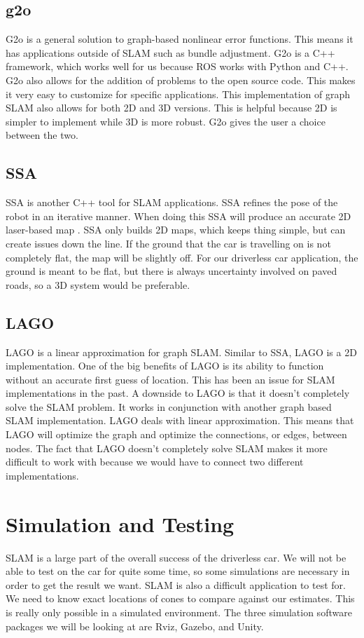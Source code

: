 \documentclass[10pt, onecolumn, draftclsnofoot, letterpaper,compsoc]{IEEEtran}
\begin{document}
\subsection{g2o}
G2o is a general solution to graph-based nonlinear error functions. This means it has applications outside of SLAM such as bundle adjustment. G2o is a C++ framework, which works well for us because ROS works with Python and C++. G2o also allows for the addition of problems to the open source code. This makes it very easy to customize for specific applications. This implementation of graph SLAM also allows for both 2D and 3D versions. This is helpful because 2D is simpler to implement while 3D is more robust. G2o gives the user a choice between the two\citep{g2o}.

\subsection{SSA}
SSA is another C++ tool for SLAM applications. SSA refines the pose of the robot in an iterative manner. When doing this SSA will produce an accurate 2D laser-based map \citep{ssa}. SSA only builds 2D maps, which keeps thing simple, but can create issues down the line. If the ground that the car is travelling on is not completely flat, the map will be slightly off. For our driverless car application, the ground is meant to be flat, but there is always uncertainty involved on paved roads, so a 3D system would be preferable.

\subsection{LAGO}
LAGO is a linear approximation for graph SLAM. Similar to SSA, LAGO is a 2D implementation\citep{lago}. One of the big benefits of LAGO is its ability to function without an accurate first guess of location. This has been an issue for SLAM implementations in the past. A downside to LAGO is that it doesn't completely solve the SLAM problem. It works in conjunction with another graph based SLAM implementation. LAGO deals with linear approximation. This means that LAGO will optimize the graph and optimize the connections, or edges, between nodes. The fact that LAGO doesn't completely solve SLAM makes it more difficult to work with because we would have to connect two different implementations. 

\section{Simulation and Testing}
SLAM is a large part of the overall success of the driverless car. We will not be able to test on the car for quite some time, so some simulations are necessary in order to get the result we want. SLAM is also a difficult application to test for. We need to know exact locations of cones to compare against our estimates. This is really only possible in a simulated environment. The three simulation software packages we will be looking at are Rviz, Gazebo, and Unity.
\end{document}
